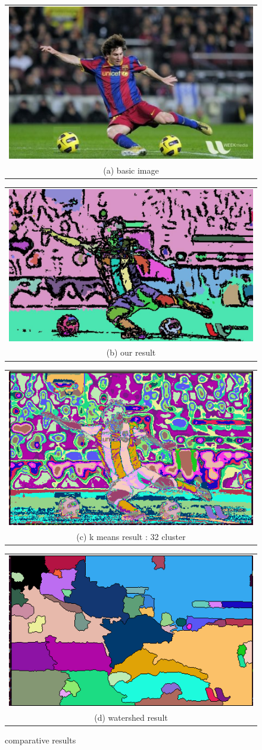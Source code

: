 \documentclass[conference]{IEEEtran}
\begin{document}
\begin{figure}[h!]
  \centering
  \begin{tabular}{@{}c@{}}
    \includegraphics[width=0.4\linewidth]{fig0.jpg} \\[\abovecaptionskip]
    \small (a) basic image
  \end{tabular}
  \begin{tabular}{@{}c@{}}
    \includegraphics[width=0.4\linewidth]{fig1.jpg} \\[\abovecaptionskip]
    \small (b) our result
  \end{tabular}

  \vspace{\floatsep}

  \begin{tabular}{@{}c@{}}
    \includegraphics[width=0.4\linewidth]{fig2.png} \\[\abovecaptionskip]
    \small (c) k means result : 32 cluster
  \end{tabular}
  \begin{tabular}{@{}c@{}}
    \includegraphics[width=0.4\linewidth]{fig3.png} \\[\abovecaptionskip]
    \small (d) watershed result
  \end{tabular}
  \caption{comparative results}
  \label{fig 1}
  
\end{figure}
\end{document}
